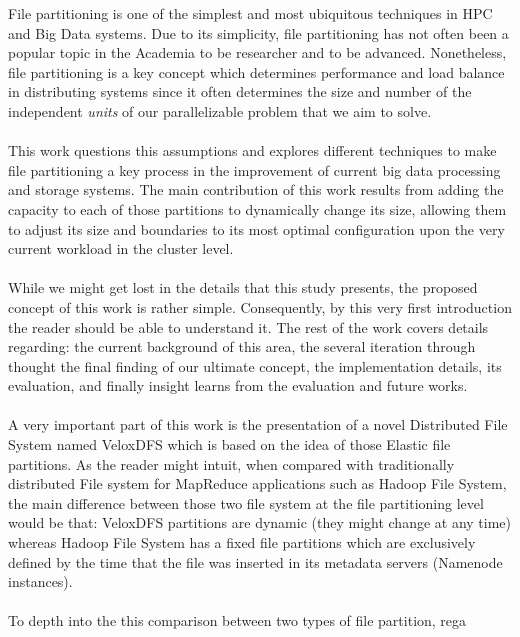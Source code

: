 File partitioning is one of the simplest and most ubiquitous techniques in HPC and Big Data systems. Due to its simplicity, file partitioning has not often been a popular topic in the Academia to be researcher and to be advanced. Nonetheless, file partitioning is a key concept which determines performance and load balance in distributing systems since it often determines the size and number of the independent \textit{units} of our parallelizable problem that we aim to solve. 
\\ \\ 
This work questions this assumptions and explores different techniques to make file partitioning a key process in the improvement of current big data processing and storage systems. The main contribution of this work results from adding the capacity to each of those partitions to dynamically change its size, allowing them to adjust its size and boundaries to its most optimal configuration upon the very current workload in the cluster level. 
\\ \\ 
While we might get lost in the details that this study presents, the proposed concept of this work is rather simple. Consequently, by this very first introduction the reader should be able to understand it. The rest of the work covers details regarding: the current background of this area, the several iteration through thought the final finding of our ultimate concept, the implementation details, its evaluation, and finally insight learns from the evaluation and future works. 
\\ \\
A very important part of this work is the presentation of a novel Distributed File System named VeloxDFS which is based on the idea of those Elastic file partitions. As the reader might intuit, when compared with traditionally distributed File system for MapReduce applications such as Hadoop File System, the main difference between those two file system at the file partitioning level would be that: VeloxDFS partitions are dynamic (they might change at any time) whereas Hadoop File System has a fixed file partitions which are exclusively defined by the time that the file was inserted in its metadata servers (Namenode instances).
\\ \\
To depth into the this comparison between two types of file partition, rega 
\lipsum[20]

